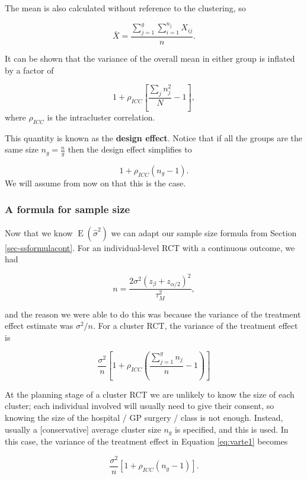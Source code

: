 \documentclass[
  openany]{book}
\theoremstyle{definition}
\theoremstyle{definition}
\theoremstyle{definition}
\theoremstyle{definition}
\theoremstyle{remark}
\begin{document}
The mean is also calculated without reference to the clustering, so

\[\bar{X} =  \frac{\sum\limits_{j=1}^g\sum\limits_{i=1}^{n_j}X_{ij}}{n}.\]

It can be shown that the variance of the overall mean in either group is inflated by a factor of

\[1 + \rho_{ICC}\left[ \frac{\sum\limits_j n_j^2}{N} - 1 \right], \]
where \(\rho_{ICC}\) is the intracluster correlation.

This quantity is known as the \textbf{design effect}. Notice that if all the groups are the same size \(n_g = \frac{n}{g}\) then the design effect simplifies to

\[1 + \rho_{ICC}\left(n_g - 1\right).\]
We will assume from now on that this is the case.

\hypertarget{ss-crt}{%
\subsubsection{A formula for sample size}\label{ss-crt}}

Now that we know \(\operatorname{E}\left(\hat{\sigma}^2\right)\) we can adapt our sample size formula from Section \ref{sec-ssformulacont}. For an individual-level RCT with a continuous outcome, we had

\begin{equation}
n = \frac{2\sigma^2\left(z_{\beta} + z_{\alpha/2}\right)^2}{\tau^2_M}, 
\label{eq:ss1}
\end{equation}

and the reason we were able to do this was because the variance of the treatment effect estimate was \(\sigma^2/n\).
For a cluster RCT, the variance of the treatment effect is

\begin{equation}
\frac{\sigma^2}{n} \left[1 + \rho_{ICC}\left(\frac{\sum\limits_{j=1}^g n_j}{n}-1\right)\right]
\label{eq:varte1}
\end{equation}

At the planning stage of a cluster RCT we are unlikely to know the size of each cluster; each individual involved will usually need to give their consent, so knowing the size of the hospital / GP surgery / class is not enough. Instead, usually a {[}conservative{]} average cluster size \(n_g\) is specified, and this is used. In this case, the variance of the treatment effect in Equation \eqref{eq:varte1} becomes

\begin{equation}
\frac{\sigma^2}{n} \left[1 + \rho_{ICC}\left(n_g-1\right)\right] .
\label{eq:varte2}
\end{equation}
\end{document}
